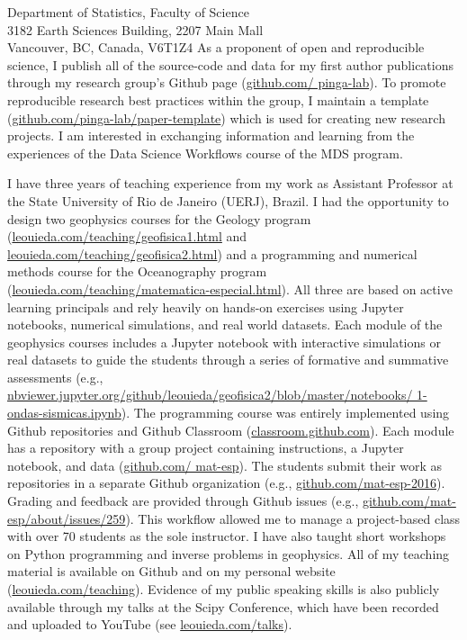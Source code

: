 \documentclass[11pt]{letter}
\begin{document}
\begin{letter}{
    Department of Statistics, Faculty of Science
    \\
    3182 Earth Sciences Building, 2207 Main Mall
    \\
    Vancouver, BC, Canada, V6T1Z4
}
As a proponent of open and reproducible science, I publish all of the
source-code and data for my first author publications through my research
group's Github page
(\href{https://github.com/pinga-lab}{github.com/ pinga-lab}).
To promote reproducible research best practices within the group,
I maintain a template
(\href{https://github.com/pinga-lab/paper-template}{github.com/pinga-lab/paper-template})
which is used for creating new research projects.
I am interested in exchanging information and learning from the experiences of
the Data Science Workflows course of the MDS program.


I have three years of teaching experience from my work as Assistant Professor
at the State University of Rio de Janeiro (UERJ), Brazil.
I had the opportunity to design two geophysics courses for the Geology
program
(\href{http://www.leouieda.com/teaching/geofisica1.html}{leouieda.com/teaching/geofisica1.html}
and
\href{http://www.leouieda.com/teaching/geofisica2.html}{leouieda.com/teaching/geofisica2.html})
and a programming and numerical methods course for the Oceanography
program
(\href{http://www.leouieda.com/teaching/matematica-especial.html}{leouieda.com/teaching/matematica-especial.html}).
All three are based on active learning principals and rely heavily on hands-on
exercises using Jupyter notebooks, numerical simulations, and real world
datasets.
Each module of the geophysics courses includes a Jupyter notebook with
interactive simulations or real datasets to guide the students through a
series of formative and summative assessments
(e.g.,
\href{http://nbviewer.jupyter.org/github/leouieda/geofisica2/blob/master/notebooks/1-ondas-sismicas.ipynb}{nbviewer.jupyter.org/github/leouieda/geofisica2/blob/master/notebooks/ 1-ondas-sismicas.ipynb}).
The programming course was entirely implemented using Github repositories and
Github Classroom (\href{https://classroom.github.com/}{classroom.github.com}).
Each module has a repository with a group project containing instructions, a
Jupyter notebook, and data
(\href{https://github.com/mat-esp}{github.com/ mat-esp}).
The students submit their work as repositories in a separate Github
organization
(e.g., \href{https://github.com/mat-esp-2016}{github.com/mat-esp-2016}).
Grading and feedback are provided through Github issues (e.g.,
\href{https://github.com/mat-esp/about/issues/259}{github.com/mat-esp/about/issues/259}).
This workflow allowed me to manage a project-based class with over 70 students
as the sole instructor.
I have also taught short workshops on Python programming and inverse problems
in geophysics.
All of my teaching material is available on Github and on my personal website
(\href{http://www.leouieda.com/teaching/}{leouieda.com/teaching}).
Evidence of my public speaking skills is also publicly available through my
talks at the Scipy Conference, which have been recorded and uploaded to YouTube
(see \href{http://www.leouieda.com/talks/}{leouieda.com/talks}).


\end{letter}
\end{document}
